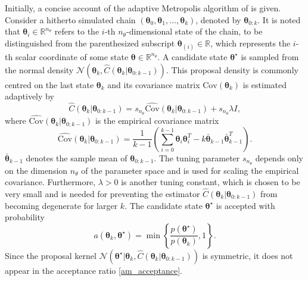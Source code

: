 \documentclass[twoside,11pt]{article}
\begin{document}
Initially, a concise account of the adaptive Metropolis algorithm of \cite{haa_sak_tam__ana} is given. Consider a hitherto
simulated chain $(\boldsymbol{\theta}_{0}, \boldsymbol{\theta}_{1},\dots,\boldsymbol{\theta}_{k})$, denoted by 
$\boldsymbol{\theta}_{0:k}$. It is noted that $\boldsymbol{\theta}_{i}\in\mathbb{R}^{n_{\theta}}$ refers to the $i$-th 
$n_{\theta}$-dimensional state of the chain, to 
be distinguished from the parenthesized subscript $\boldsymbol{\theta}_{(i)}\in\mathbb{R}$, which represents the $i$-th 
scalar coordinate of some state $\boldsymbol{\theta}\in\mathbb{R}^{n_{\theta}}$. A candidate state 
$\boldsymbol{\theta}^{\star}$ is sampled from the normal density
$\mathcal{N}(\boldsymbol{\theta}_{k}, \hat{C}(\boldsymbol{\theta}_{k}|\boldsymbol{\theta}_{0:k-1}))$. This proposal density 
is commonly centred on the last state $\boldsymbol{\theta}_{k}$ and its covariance matrix 
$\mbox{Cov}(\boldsymbol{\theta}_{k})$ is estimated adaptively by
\begin{equation}
\label{am_c}
\hat{C}(\boldsymbol{\theta}_{k}|\boldsymbol{\theta}_{0:k-1})=
s_{n_{\theta}}\widehat{\mbox{Cov}}(\boldsymbol{\theta}_{k}|\boldsymbol{\theta}_{0:k-1})+
s_{n_{\theta}}\lambda I,
\end{equation}
where $\widehat{\mbox{Cov}}(\boldsymbol{\theta}_{k}|\boldsymbol{\theta}_{0:k-1})$ is the empirical covariance 
matrix
\begin{equation}
\label{am_cov}
\widehat{\mbox{Cov}}(\boldsymbol{\theta}_{k}|\boldsymbol{\theta}_{0:k-1})=
\frac{1}{k-1}\left(
\sum_{i=0}^{k-1}\boldsymbol{\theta}_{i}\boldsymbol{\theta}_{i}^{T}-
k\bar{\boldsymbol{\theta}}_{k-1}\bar{\boldsymbol{\theta}}_{k-1}^{T}
\right).
\end{equation}
$\bar{\boldsymbol{\theta}}_{k-1}$ denotes the sample mean of $\boldsymbol{\theta}_{0:k-1}$. The tuning parameter 
$s_{n_{\theta}}$ depends only on the dimension $n_{\theta}$ of the parameter space and is used for scaling the empirical 
covariance. Furthermore, $\lambda>0$ is another tuning constant, which is chosen to be very small and is needed for 
preventing the estimator $\hat{C}(\boldsymbol{\theta}_{k}|\boldsymbol{\theta}_{0:k-1})$ from becoming degenerate for larger 
$k$. The candidate state $\boldsymbol{\theta}^{\star}$ is accepted with probability
\begin{equation}
\label{am_acceptance}
a(\boldsymbol{\theta}_{k},\boldsymbol{\theta}^{\star}) =
\min\left\{
\frac{p(\boldsymbol{\theta}^{\star})}{p(\boldsymbol{\theta}_{k})}
, 1
\right\}.
\end{equation}
Since the proposal kernel
$
\mathcal{N}(\boldsymbol{\theta}^{\star}|\boldsymbol{\theta}_{k}, 
\hat{C}(\boldsymbol{\theta}_{k}|\boldsymbol{\theta}_{0:k-1}))
$
is symmetric, it does not appear in the acceptance ratio \eqref{am_acceptance}.
\end{document}
